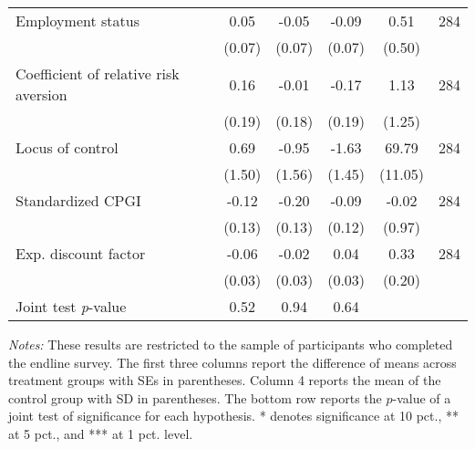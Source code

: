 \begin{table}[h]
{\begin{threeparttable}
\begin{tabular}{l*{5}{c}}
Employment status&     0.05&    -0.05&    -0.09&     0.51&      284\\
          &   (0.07)&   (0.07)&   (0.07)&   (0.50)&         \\
Coefficient of relative risk aversion&     0.16&    -0.01&    -0.17&     1.13&      284\\
          &   (0.19)&   (0.18)&   (0.19)&   (1.25)&         \\
Locus of control&     0.69&    -0.95&    -1.63&    69.79&      284\\
          &   (1.50)&   (1.56)&   (1.45)&  (11.05)&         \\
Standardized CPGI&    -0.12&    -0.20&    -0.09&    -0.02&      284\\
          &   (0.13)&   (0.13)&   (0.12)&   (0.97)&         \\
Exp. discount factor&-0.06\sym{**}&    -0.02&     0.04&     0.33&      284\\
          &   (0.03)&   (0.03)&   (0.03)&   (0.20)&         \\
\midrule Joint test \emph{p}-value&     0.52&     0.94&     0.64&         &         \\
\bottomrule \end{tabular} \begin{tablenotes}[flushleft] \footnotesize \item \emph{Notes:} These results are restricted to the sample of participants who completed the endline survey. The first three columns report the difference of means across treatment groups with SEs in parentheses. Column 4 reports the mean of the control group with SD in parentheses. The bottom row reports the \(p\)-value of a joint test of significance for each hypothesis. * denotes significance at 10 pct., ** at 5 pct., and *** at 1 pct. level. \end{tablenotes} \end{threeparttable} } \end{table}

